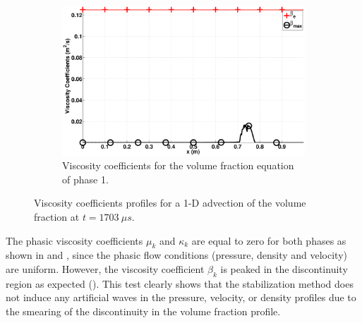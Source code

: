 \documentclass[preprint,10pt]{elsarticle}
\begin{document}
\begin{figure}[H]
        \begin{subfigure}[b]{0.495\textwidth}
                \centering
                \includegraphics[width=\textwidth]{figures/liquid_beta.eps}
                \caption{Viscosity coefficients for the volume fraction equation of phase 1.}
                \label{fig:adv-vf-beta}
        \end{subfigure}        
        \caption{Viscosity coefficients profiles for a 1-D advection of the volume fraction at $t=1703 \ \mu s$.}\label{adv-vf-visc}
\end{figure}
%
The phasic viscosity coefficients $\mu_k$ and $\kappa_k$ are equal to zero for both phases as shown in  and , since the phasic 
flow conditions (pressure, density and velocity) are uniform. However, the viscosity coefficient $\beta_k$ is peaked in the discontinuity region as expected 
(). This test clearly shows that the stabilization method does not induce any artificial waves in the pressure, velocity, or density 
profiles due to the smearing of the discontinuity in the volume fraction profile. 
\end{document}

